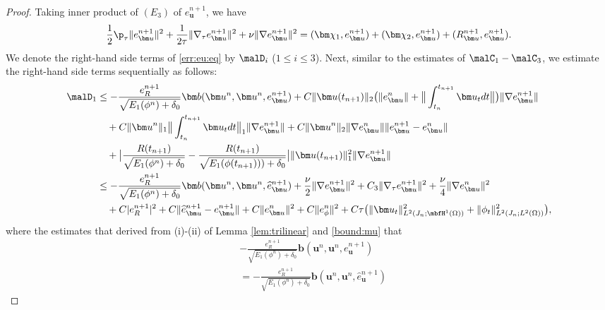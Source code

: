 \begin{proof}
	Taking inner product of $({E_3})$ of $e_{\bm u}^{n+1}$, we have
	\begin{equation} \label{err:eu:eq}
			\frac{1}{2}\p_\tau \|e_{\bm u}^{n+1}\|^2 + \frac{1}{2\tau} \|\nabla_\tau e_{\bm u}^{n+1}\|^2 +\nu \|\nabla e_{\bm u}^{n+1}\|^2   =(\bm \chi_1,  e_{\bm u}^{n+1})+(\bm \chi_2, e_{\bm u}^{n+1})+(R_{\bm u}^{n+1}, e_{\bm u}^{n+1}). 
	\end{equation}
	We denote the right-hand side terms of \eqref{err:eu:eq} by $\malD_i$ ($1\le i \le 3$).
	Next, similar  to the estimates of ${\malC}_1-{\malC}_3$,	we estimate the right-hand side terms sequentially as follows:
	\begin{equation*} 
		\begin{aligned}
			\malD_1  
			& \leq -\frac{e_R^{n+1}}{\sqrt{E_1(\phi^n)+\delta_0}} \bm b(\bm u^n,  \bm u^n, e_{\bm u}^{n+1} ) + C  \|\bm u(t_{n+1})\|_2   \big(\|e_{\bm u}^n\|+\big\|\int_{t_n}^{t_{n+1}} \bm u_t d t\big\| \big) \|\nabla e_{\bm u}^{n+1}\|  \\
			& \quad + C\|{\bm u}^n\|_1 \big\|\int_{t_n}^{t_{n+1}} \bm u_t d t\big\|_1   \|\nabla e_{\bm u}^{n+1}\|
			         +   C\|{\bm u}^n\|_2 \|\nabla e_{\bm u}^n\|\|e_{\bm u}^{n+1}-e_{\bm u}^n\|   \\
			& \quad + \big|\frac{R(t_{n+1})}{\sqrt{E_1(\phi^n)+\delta_0}} - \frac{R(t_{n+1})}{\sqrt{E_1(\phi(t_{n+1})))+\delta_0}} \big|  \|\bm u(t_{n + 1})\|_1^2  
			         \|\nabla e_{\bm u}^{n+1}\| \\
			& \leq -\frac{e_R^{n+1}}{\sqrt{E_1(\phi^n)+\delta_0}} \bm b(\bm u^n,  \bm u^n, \widehat e_{\bm u}^{n+1} )  + \frac{\nu}{2} \|\nabla e_{\bm u}^{n+1}\|^2    
			        +C_3\|\nabla_\tau e_{\bm u}^{n+1}\|^2 +  \frac{\nu}{4}\|\nabla e_{\bm u}^{n}\|^2\\
			& \quad  + C|e_R^{n+1}|^2 + C\|\widehat{e}_{\bm u}^{n+1}-e_{\bm u}^{n+1}\| + C\|e_{\bm u}^{n}\|^2  
			  +C\|e_{\phi}^n\|^2  +C\tau \big(\|\bm u_t\|_{L^2(J_n;\mbfH^1(\Omega))}^2
		      	+\|\phi_t\|_{L^2(J_n ; L^2(\Omega))}^2\big),
		\end{aligned}
	\end{equation*}
	where the estimates that derived from (i)-(ii) of Lemma  \ref{lem:trilinear} and \eqref{bound:mu} that
	\begin{equation*}
		\begin{aligned}
			&  -\frac{e_R^{n+1}}{\sqrt{E_1(\phi^n)+\delta_0}} \bm b(\bm u^n,  \bm u^n, e_{\bm u}^{n+1} ) \\
			& = -\frac{e_R^{n+1}}{\sqrt{E_1(\phi^n)+\delta_0}} \bm b(\bm u^n,  \bm u^n, \widehat e_{\bm u}^{n+1}) 

\end{aligned}
\end{equation*}
\end{proof}
